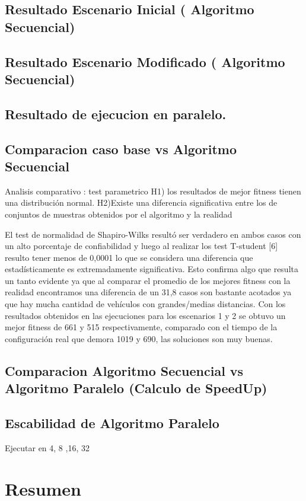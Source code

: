\subsection{Resultado Escenario Inicial ( Algoritmo  Secuencial)}
\subsection{Resultado Escenario Modificado ( Algoritmo  Secuencial)}
\subsection{Resultado de ejecucion en paralelo. }

\subsection{Comparacion caso base vs Algoritmo Secuencial}
Analisis comparativo : test parametrico
H1)  los  resultados  de  mejor  fitness  tienen  una
distribución normal.
H2)Existe  una  diferencia  significativa  entre  los  de
conjuntos  de  muestras  obtenidos  por  el  algoritmo  y  la
realidad

El  test  de  normalidad  de  Shapiro-Wilks  resultó  ser
verdadero  en  ambos  casos  con  un  alto  porcentaje  de
confiabilidad y luego al realizar los test T-student [6] resulto
tener menos de 0,0001 lo que se considera una diferencia que
estadísticamente  es  extremadamente  significativa.  Esto
confirma algo que resulta un tanto evidente ya que al comparar
el promedio de los mejores fitness con la realidad encontramos
una diferencia de un 31,8%
casos  son  bastante  acotados  ya  que  hay  mucha  cantidad  de
vehículos con grandes/medias distancias.
Con  los  resultados  obtenidos  en  las  ejecuciones  para  los
escenarios  1  y  2  se  obtuvo  un  mejor  fitness  de  661  y  515
respectivamente, comparado con el tiempo de la configuración
real que demora 1019 y 690, las soluciones son muy buenas.



\subsection{Comparacion Algoritmo Secuencial vs Algoritmo Paralelo (Calculo de SpeedUp)}

\subsection{Escabilidad de Algoritmo Paralelo }
Ejecutar en 4, 8 ,16, 32

\section{Resumen}

